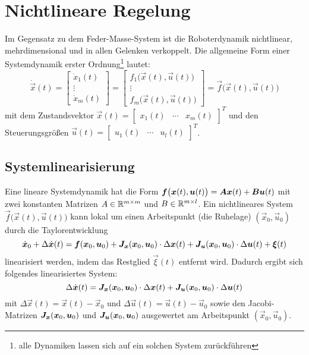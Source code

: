 	\section{Nichtlineare Regelung}
		Im Gegensatz zu dem Feder-Masse-System ist die Roboterdynamik \iA nichtlinear, mehrdimensional und in allen Gelenken verkoppelt. Die allgemeine Form einer Systemdynamik erster Ordnung\footnote{alle Dynamiken lassen sich auf ein solchen System zurückführen} lautet:
		\begin{equation*}
			\dot{\vec{x}}(t) =
				\begin{bmatrix}
					\dot{x}_1(t) \\
					\vdots \\
					\dot{x}_m(t)
				\end{bmatrix}
			=
				\begin{bmatrix}
					f_1\big(\vec{x}(t), \vec{u}(t)\big) \\
					\vdots \\
					f_m\big(\vec{x}(t), \vec{u}(t)\big)
				\end{bmatrix}
			= \vec{f}\big(\vec{x}(t), \vec{u}(t)\big)
		\end{equation*}
		mit dem Zustandsvektor \( \vec{x}(t) = \begin{bmatrix} x_1(t) & \cdots & x_m(t) \end{bmatrix}^T \) und den Steuerungsgrößen \( \vec{u}(t) = \begin{bmatrix} u_1(t) & \cdots & u_l(t) \end{bmatrix}^T \).

		\subsection{Systemlinearisierung}
			Eine lineare Systemdynamik hat die Form \( \bm{f}\big(\bm{x}(t), \bm{u}(t)\big) = \bm{A} \bm{x}(t) + \bm{B} \bm{u}(t) \) mit zwei konstanten Matrizen \( A \in \mathbb{R}^{m \times m} \) und \( B \in \mathbb{R}^{m \times l} \). Ein nichtlineares System \( \vec{f}\big(\vec{x}(t), \vec{u}(t)\big) \) kann lokal um einen Arbeitspunkt (\bspw die Ruhelage) \( (\vec{x}_0, \vec{u}_0) \) durch die Taylorentwicklung
			\begin{equation*}
				\dot{\bm{x}}_0 + \Delta\dot{\bm{x}}(t) = \bm{f}(\bm{x}_0, \bm{u}_0) + \bm{J}_{\bm{x}}(\bm{x}_0, \bm{u}_0) \cdot \Delta\bm{x}(t) + \bm{J}_{\bm{u}}(\bm{x}_0, \bm{u}_0) \cdot \Delta\bm{u}(t) + \bm{\xi}(t)
			\end{equation*}
			linearisiert werden, indem das Restglied \(\vec{\xi}(t)\) entfernt wird. Dadurch ergibt sich folgendes linearisiertes System:
			\begin{equation*}
				\Delta\dot{\bm{x}}(t) = \bm{J}_{\bm{x}}(\bm{x}_0, \bm{u}_0) \cdot \Delta\bm{x}(t) + \bm{J}_{\bm{u}}(\bm{x}_0, \bm{u}_0) \cdot \Delta\bm{u}(t)
			\end{equation*}
			mit \( \Delta\vec{x}(t) = \vec{x}(t) - \vec{x}_0 \) und \( \Delta\vec{u}(t) = \vec{u}(t) - \vec{u}_0 \) sowie den Jacobi-Matrizen \( \bm{J}_{\bm{x}}(\bm{x}_0, \bm{u}_0) \) und \( \bm{J}_{\bm{u}}(\bm{x}_0, \bm{u}_0) \) ausgewertet am Arbeitspunkt \( (\vec{x}_0, \vec{u}_0) \).

